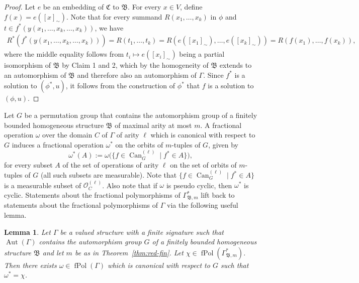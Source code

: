 \documentclass[nonacm]{acmart}
\newcommand{\bB}{{\mathfrak B}}
\newcommand{\bC}{{\mathfrak C}}
\DeclareMathOperator{\Can}{Can}
\DeclareMathOperator{\Aut}{Aut}
\DeclareMathOperator{\fPol}{fPol}
\newtheorem{lemma}[theorem]{Lemma}
\begin{document}
\begin{proof}
\medskip

Let $e$ be an embedding of $\bC$ to $\bB$. For every $x \in V$, define $f(x)=e([x]_\sim)$. Note that for every summand $R(x_1, \dots, x_k)$ in $\phi$ and $t \in f^*(y(x_1, \dots, x_k, \dots, x_k))$, we have
\begin{align*}
R^*(f^*(y(x_1, \dots, x_k, \dots, x_k)))  = R(t_1, \dots, t_k) = R(e([x_1]_\sim), \dots, e([x_k]_\sim)) = R(f(x_1), \dots, f(x_k)),
\end{align*}
where the middle equality follows from $t_i \mapsto e([x_i]_\sim)$ being a partial isomorphism of $\bB$ by Claim 1 and 2, which by the homogeneity of $\bB$ extends to an automorphism of $\bB$ and therefore also an automorphism of $\Gamma$.
Since $f^*$ is a solution to $(\phi^*,u)$, it follows from the construction of $\phi^*$ that $f$ is a solution to $(\phi,u)$.
\end{proof}

Let $G$ be a permutation group that contains the automorphism group of 
a finitely bounded homogeneous structure $\bB$ 
of maximal arity 
at most $m$. 
A fractional operation $\omega$ over the domain $C$ of  
$\Gamma$ of arity $\ell$ which is canonical with respect to $G$ 
 induces a fractional operation $\omega^*$ on the orbits of $m$-tuples 
 of  $G$, given by
 $$\omega^*(A) := \omega \big ( \{f \in \Can^{(\ell)}_G \mid f^* \in A\} \big ),
 $$
for every subset $A$ of the set of operations of arity $\ell$ on the 
set of orbits of $m$-tuples of $G$ 
(all such subsets are measurable). Note that 
$\{f \in \Can^{(\ell)}_G \mid f^* \in A\}$ is a measurable subset of $\mathscr O_C^{(\ell)}$.
Also note that if $\omega$ is pseudo cyclic, then $\omega^*$ is cyclic.
Statements about the fractional polymorphisms of $\Gamma^*_{\bB,m}$ lift back to statements about the fractional polymorphisms of $\Gamma$ via the following useful lemma. 

\begin{lemma}\label{lem:lift}
Let $\Gamma$ be a valued structure with a finite signature 
such that $\Aut(\Gamma)$ contains the automorphism group $G$ of a finitely bounded homogeneous structure $\bB$
and let $m$ be as in Theorem~\ref{thm:red-fin}. Let 
$\chi \in \fPol(\Gamma^*_{\bB,m})$.
Then there exists $\omega \in \fPol(\Gamma)$ which is canonical with respect to $G$ such that $\omega^* = \chi$.  
\end{lemma}
\end{document}
